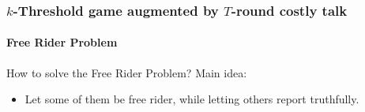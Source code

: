 \documentclass[8pt]{beamer}
\begin{document}
\begin{frame}
  \frametitle{$k$-Threshold game augmented by $T$-round costly talk}
  \framesubtitle{Free Rider Problem}


How to solve the Free Rider Problem? Main idea:

\begin{itemize}
\item Let some of them be free rider, while letting others report truthfully.
\end{itemize}


\end{frame}
\end{document}
